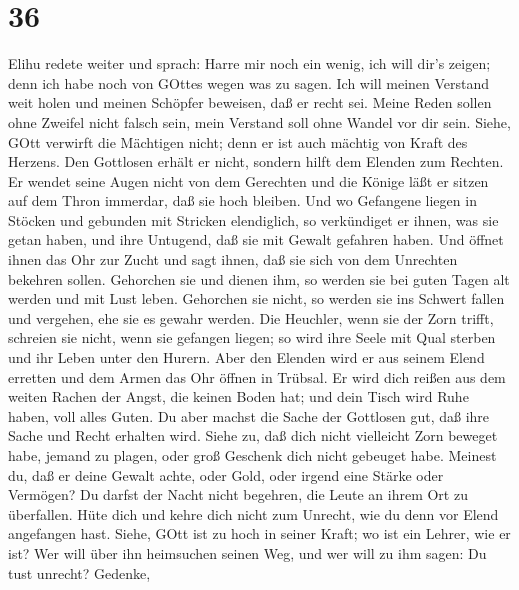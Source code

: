 \hypertarget{section-35}{%
\section{36}\label{section-35}}

 Elihu redete weiter und sprach:  Harre mir noch
ein wenig, ich will dir's zeigen; denn ich habe noch von GOttes wegen
was zu sagen.  Ich will meinen Verstand weit holen und
meinen Schöpfer beweisen, daß er recht sei.  Meine Reden
sollen ohne Zweifel nicht falsch sein, mein Verstand soll ohne Wandel
vor dir sein.  Siehe, GOtt verwirft die Mächtigen nicht;
denn er ist auch mächtig von Kraft des Herzens.  Den
Gottlosen erhält er nicht, sondern hilft dem Elenden zum Rechten.
 Er wendet seine Augen nicht von dem Gerechten und die
Könige läßt er sitzen auf dem Thron immerdar, daß sie hoch bleiben.
 Und wo Gefangene liegen in Stöcken und gebunden mit
Stricken elendiglich,  so verkündiget er ihnen, was sie
getan haben, und ihre Untugend, daß sie mit Gewalt gefahren haben.
 Und öffnet ihnen das Ohr zur Zucht und sagt ihnen, daß sie
sich von dem Unrechten bekehren sollen.  Gehorchen sie und
dienen ihm, so werden sie bei guten Tagen alt werden und mit Lust leben.
 Gehorchen sie nicht, so werden sie ins Schwert fallen und
vergehen, ehe sie es gewahr werden.  Die Heuchler, wenn sie
der Zorn trifft, schreien sie nicht, wenn sie gefangen liegen;
 so wird ihre Seele mit Qual sterben und ihr Leben unter
den Hurern.  Aber den Elenden wird er aus seinem Elend
erretten und dem Armen das Ohr öffnen in Trübsal.  Er wird
dich reißen aus dem weiten Rachen der Angst, die keinen Boden hat; und
dein Tisch wird Ruhe haben, voll alles Guten.  Du aber
machst die Sache der Gottlosen gut, daß ihre Sache und Recht erhalten
wird.  Siehe zu, daß dich nicht vielleicht Zorn beweget
habe, jemand zu plagen, oder groß Geschenk dich nicht gebeuget habe.
 Meinest du, daß er deine Gewalt achte, oder Gold, oder
irgend eine Stärke oder Vermögen?  Du darfst der Nacht
nicht begehren, die Leute an ihrem Ort zu überfallen.  Hüte
dich und kehre dich nicht zum Unrecht, wie du denn vor Elend angefangen
hast.  Siehe, GOtt ist zu hoch in seiner Kraft; wo ist ein
Lehrer, wie er ist?  Wer will über ihn heimsuchen seinen
Weg, und wer will zu ihm sagen: Du tust unrecht?  Gedenke,
